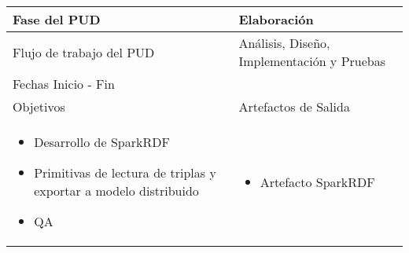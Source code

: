 
\begin{tabular}{|p{}|p{}|}

\hline

\cellcolor[gray]{0.7}Fase del \acs{PUD} & Elaboración
 \\
\hline

\cellcolor[gray]{0.7}Flujo de trabajo del \acs{PUD} & Análisis, Diseño,
Implementación y Pruebas
 \\
\hline

\cellcolor[gray]{0.7}Fechas Inicio - Fin  &
 \\
\hline

\cellcolor[gray]{0.7}Objetivos  &
\cellcolor[gray]{0.7}Artefactos de Salida \\
\hline

\begin{itemize}
\item Desarrollo de SparkRDF
\item Primitivas de lectura de triplas y exportar a modelo distribuido
\item QA
\end{itemize}

&

\begin{itemize}
\item Artefacto SparkRDF 
\end{itemize}
\\
\hline
\end{tabular}


